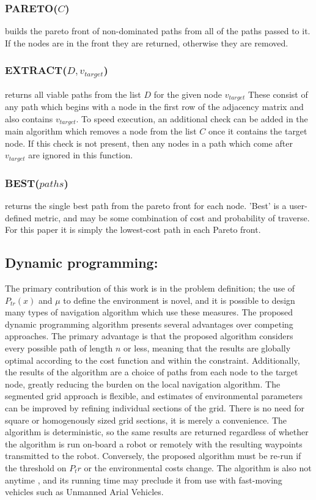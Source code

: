\documentclass[journal]{IEEEtran}
\newcounter{row}
\begin{document}
\subsubsection{PARETO($C$)} builds the pareto front of non-dominated paths from all of the paths passed to it. If the nodes are in the front they are returned, otherwise they are removed.
\subsubsection{EXTRACT($D, v_{target}$)} returns all viable paths from the list $D$ for the given node $v_{target}$
These consist of any path which begins with a node in the first row of the adjacency matrix and also contains $v_{target}$. 
To speed execution, an additional check can be added in the main algorithm which removes a node from the list $C$ once it contains the target node. 
If this check is not present, then any nodes in a path which come after $v_{target}$ are ignored in this function.
\subsubsection{BEST($paths$)} returns the single best path from the pareto front for each node. 'Best' is a user-defined metric, and may be some combination of cost and probability of traverse. For this paper it is simply the lowest-cost path in each Pareto front.

\subsection{Dynamic programming:}
The primary contribution of this work is in the problem definition; the use of $P_{tr}(x)$ and $\mu$ to define the environment is novel, and it is possible to design many types of navigation algorithm which use these measures. 
The proposed dynamic programming algorithm presents several advantages over competing approaches.
The primary advantage is that the proposed algorithm considers every possible path of length $n$ or less, meaning that the results are globally optimal according to the cost function and within the constraint. 
Additionally, the results of the algorithm are a choice of paths from each node to the target node, greatly reducing the burden on the local navigation algorithm.
The segmented grid approach is flexible, and estimates of environmental parameters can be improved by refining individual sections of the grid. There is no need for square or homogenously sized grid sections, it is merely a convenience.
The algorithm is deterministic, so the same results are returned regardless of whether the algorithm is run on-board a robot or remotely with the resulting waypoints transmitted to the robot.
Conversely, the proposed algorithm must be re-run if the threshold on $P_tr$ or the environmental costs change. 
The algorithm is also not anytime \cite{definition of anytime}, and its running time may preclude it from use with fast-moving vehicles such as Unmanned Arial Vehicles.
\end{document}
